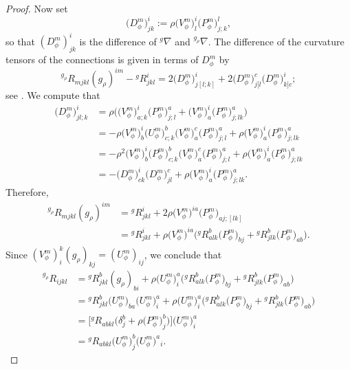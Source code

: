 \documentclass[10pt,a4paper]{amsart}
\numberwithin{equation}{section}
\begin{document}
\begin{proof}
Now set
\[
\big(D_\phi^m\big)_{j k}^{i}:=\rho \big(V_\phi^m\big)_{l}^{i} \big(P_\phi^m\big)_{j; k}^{l},
\]
so that $(D_\phi^m)_{j k}^{i}$ is the difference of ${}^{g}\nabla$ and ${}^{g_\rho}\nabla$. The difference of the curvature tensors of the connections is given in terms of $D_\phi^m$ by
\[
{ }^{g_\rho} R_{m j k l} (g_\rho)^{i m}-{ }^{g} R_{j k l}^{i}=2 \big(D_\phi^m\big)_{j[l; k]}^{i}+2 \big(D_\phi^m\big)_{j[l}^{c} \big(D_\phi^m\big)_{k] c}^{i};
\]
see \cite[p.~70]{FeffermanGraham2012}.
We compute that
\begin{align*}
\big(D_\phi^m\big)_{j l; k}^{i} &=\rho\bigl(\big(V_\phi^m\big)_{a; k}^{i} \big(P_\phi^m\big)_{j; l}^{a}+\big(V_\phi^m\big)_{a}^{i} \big(P_\phi^m\big)_{j; l k}^{a}\bigr)
\\[.5mm]
&=-\rho \big(V_\phi^m\big)_{b}^{i} \big(U_\phi^m\big)_{c; k}^{b} \big(V_\phi^m\big)_{a}^{c} \big(P_\phi^m\big)_{j; l}^{a}+\rho \big(V_\phi^m\big)_{a}^{i} \big(P_\phi^m\big)_{j; l k}^{a}
\\[.5mm]
&=-\rho^{2} \big(V_\phi^m\big)_{b}^{i} \big(P_\phi^m\big)_{c; k}^{b} \big(V_\phi^m\big)_{a}^{c} \big(P_\phi^m\big)_{j; l}^{a}+\rho \big(V_\phi^m\big)_{a}^{i} \big(P_\phi^m\big)_{j; l k}^{a}
\\[.5mm]
&=-\big(D_\phi^m\big)_{c k}^{i} \big(D_\phi^m\big)_{j l}^{c}+\rho \big(V_\phi^m\big)_{a}^{i} \big(P_\phi^m\big)_{j; l k}^{a}.
\end{align*}
Therefore,
\begin{align*}
{ }^{g_\rho} R_{m j k l} (g_\rho)^{i m} &={ }^{g} R_{j k l}^{i}+2 \rho \big(V_\phi^m\big)^{i a} \big(P_\phi^m\big)_{a j;[l k]}
\\[.5mm]
&={ }^{g} R_{j k l}^{i}+\rho \big(V_\phi^m\big)^{i a}\bigl({ }^{g} R_{a l k}^{b} \big(P_\phi^m\big)_{b j}+{ }^{g} R_{j l k}^{b} \big(P_\phi^m\big)_{a b}\bigr).
\end{align*}
Since $(V_\phi^m)_{i}^{k} (g_\rho)_{k j}=(U_\phi^m)_{i j}$, we conclude that
\begin{align*}
{ }^{g_\rho} R_{i j k l} &={ }^{g} R_{j k l}^{b} (g_\rho)_{b i}+\rho \big(U_\phi^m\big)_{i}^{a}\bigl({ }^{g} R_{a l k}^{b} \big(P_\phi^m\big)_{b j}+{ }^{g} R_{j l k}^{b} \big(P_\phi^m\big)_{a b}\bigr)
\\[.5mm]
&={ }^{g} R_{j k l}^{b} \big(U_\phi^m\big)_{b a} \big(U_\phi^m\big)_{i}^{a}+\rho \big(U_\phi^m\big)^{a}_{i}\bigl({ }^{g} R_{a l k}^{b} \big(P_\phi^m\big)_{b j}+{ }^{g} R_{j l k}^{b} \big(P_\phi^m\big)_{a b}\bigr)
\\[.5mm]
&=\bigl[{ }^{g} R_{a b k l}\bigl(\delta_{j}^{b}+\rho \big(P_\phi^m\big)_{j}^{b}\bigr)\bigr] \big(U_\phi^m\big)_{i}^{a} \\[.5mm]
&={ }^{g} R_{a b k l} \big(U_\phi^m\big)_{j}^{b} \big(U_\phi^m\big)^{a}{ }_{i}.\tag*{\qed}
\end{align*}
\renewcommand{\qed}{}
\end{proof}
\end{document}

